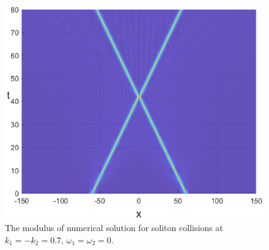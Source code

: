 \documentclass[preprint,12pt]{elsarticle}
\begin{document}
\begin{figure}[H]
\begin{minipage}[h]{0.32\linewidth}
\includegraphics[width=1\linewidth]{fig60.eps}
\end{minipage}
\caption{The modulus of numerical solution for soliton collisions at \(k_{1}=-k_{2}=0.7,\,\omega_{1}=\omega_{2}=0\).}
\label{fig50}
\end{figure}
\end{document}
